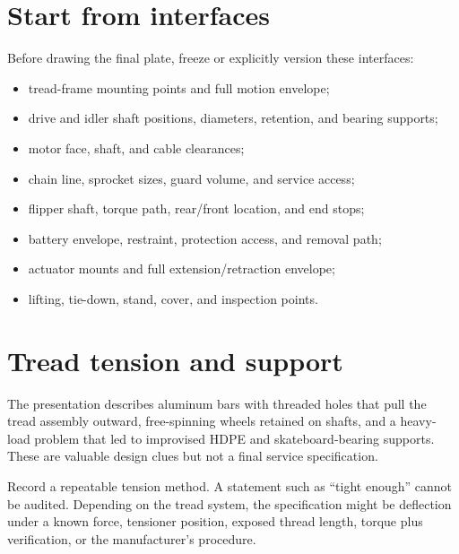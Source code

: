\documentclass[10pt,openany]{book}
\begin{document}
\section{Start from interfaces}

Before drawing the final plate, freeze or explicitly version these interfaces:

\begin{itemize}
  \item tread-frame mounting points and full motion envelope;
  \item drive and idler shaft positions, diameters, retention, and bearing supports;
  \item motor face, shaft, and cable clearances;
  \item chain line, sprocket sizes, guard volume, and service access;
  \item flipper shaft, torque path, rear/front location, and end stops;
  \item battery envelope, restraint, protection access, and removal path;
  \item actuator mounts and full extension/retraction envelope;
  \item lifting, tie-down, stand, cover, and inspection points.
\end{itemize}


\section{Tread tension and support}

The presentation describes aluminum bars with threaded holes that pull the tread assembly outward, free-spinning wheels retained on shafts, and a heavy-load problem that led to improvised HDPE and skateboard-bearing supports. These are valuable design clues but not a final service specification.

Record a repeatable tension method. A statement such as ``tight enough'' cannot be audited. Depending on the tread system, the specification might be deflection under a known force, tensioner position, exposed thread length, torque plus verification, or the manufacturer's procedure.

\end{document}
